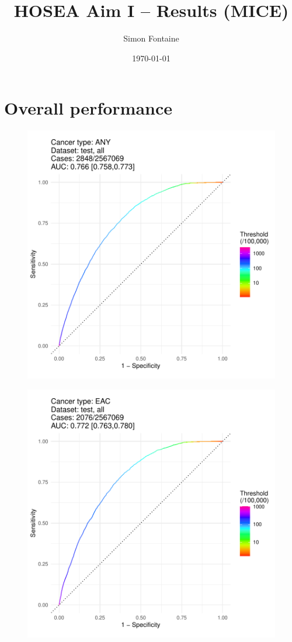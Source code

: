 \documentclass[english]{article}
\title{HOSEA Aim I -- Results (MICE)}
\author{Simon Fontaine}
\date{\today}
\begin{document}
\maketitle
\tableofcontents

\newpage
\clearpage
\section{Overall performance}

\begin{figure}[ht]
\includegraphics[width=1.0\linewidth]{roc/ANY_all.pdf}
\end{figure}
\begin{figure}[ht]
\includegraphics[width=1.0\linewidth]{roc/EAC_all.pdf}
\end{figure}
\end{document}
